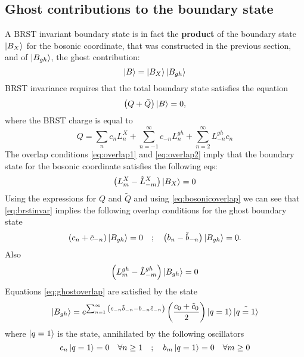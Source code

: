 \subsection{Ghost contributions to the boundary state}
A BRST invariant boundary state is in fact the \textbf{product} of the boundary state $\ket{B_X}$ for the bosonic coordinate, that was constructed in the previous section, and of $\ket{B_{gh}}$, the ghost contribution:
\begin{equation}
	\ket{B} = \ket{B_X}\ket{B_{gh}}
\end{equation}
BRST invariance requires that the total boundary state satisfies the equation
\begin{equation}
	\left(Q + \tilde{Q}\right)\ket{B} = 0,
	\label{eq:brstinvar}
\end{equation}
where the BRST charge is equal to
\begin{equation}
	Q = \sum_{n}{c_n}L_n^{X} + \sum_{n=-1}^{\infty}{c_{-n}L^{gh}_n} + \sum_{n=2}^{\infty}{L^{gh}_{-n}c_n}
\end{equation}
The overlap conditions \eqref{eq:overlap1} and \eqref{eq:overlap2} imply that the boundary state for the bosonic coordinate satisfies the following eqs:
\begin{equation}
	\left(L^X_m - \tilde{L}^X_{-m}\right)\ket{B_X} = 0
	\label{eq:bosonicoverlap}
\end{equation}
Using the expressions for $Q$ and $\tilde{Q}$ and using \eqref{eq:bosonicoverlap} we can see that \eqref{eq:brstinvar} implies the following overlap conditions for the ghost boundary state
\begin{equation}
	\left(c_n+\tilde{c}_{-n}\right)\ket{B_{gh}} = 0\quad ; \quad \left(b_n - \tilde{b}_{-n}\right)\ket{B_{gh}} = 0.
	\label{eq:ghostoverlap}
\end{equation}
Also
\begin{equation}
	\left(L^{gh}_m - \tilde{L}^{gh}_{-m}\right)\ket{B_{gh}} = 0
\end{equation}
Equations \eqref{eq:ghostoverlap} are satisfied by the state
\begin{equation}
	\ket{B_{gh}} = e^{\sum_{n=1}^{\infty}{\left(c_{-n}\tilde{b}_{-n}-b_{-n}\tilde{c}_{-n}\right)}}\left(\frac{c_0 + \tilde{c}_0}{2}\right)\ket{q=1}\tilde{\ket{q=1}}
\end{equation}
where $\ket{q=1}$ is the state, annihilated by the following oscillators
\begin{equation}
	c_n\ket{q=1} = 0\quad\forall n\geq 1\quad;\quad b_m\ket{q=1} = 0\quad\forall m\geq 0
\end{equation}

